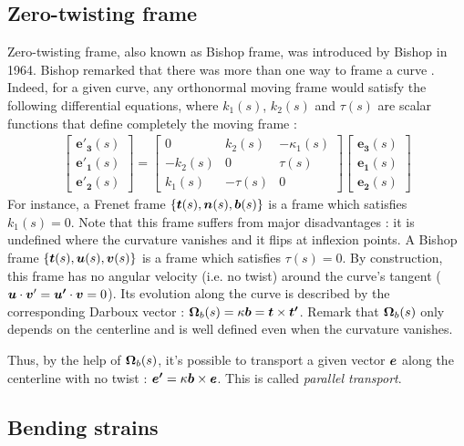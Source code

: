 \subsection{Zero-twisting frame}
Zero-twisting frame, also known as Bishop frame, was introduced by Bishop in 1964. Bishop remarked that there was more than one way to frame a curve \cite{Bishop1975}. Indeed, for a given curve, any orthonormal moving frame would satisfy the following differential equations, where $k_1(s)$, $k_2 (s)$ and $\tau(s)$ are scalar functions that define completely the moving frame :
\begin{gather}
	\begin{bmatrix}
		\mathbf{e'_{3}}(s) \\
		\mathbf{e'_{1}}(s) \\
		\mathbf{e'_{2}}(s)
	\end{bmatrix}
=
	\begin{bmatrix}
		0 & k_{2}(s) & -\kappa_{1}(s) \\
		-k_{2}(s) & 0 & \tau(s) \\
		k_{1}(s) & -\tau(s) & 0
	\end{bmatrix}
	\begin{bmatrix}
		\mathbf{e_{3}}(s) \\
		\mathbf{e_{1}}(s) \\
		\mathbf{e_{2}}(s)
	\end{bmatrix}
\end{gather}
For instance, a Frenet frame $\{\boldsymbol{t}(s),\boldsymbol{n}(s),\boldsymbol{b}(s)\}$ is a frame which satisfies $k_1(s)=0$. Note that this frame suffers from major disadvantages : it is undefined where the curvature vanishes and it flips at inflexion points.
A Bishop frame $\{\boldsymbol{t}(s),\boldsymbol{u}(s),\boldsymbol{v}(s)\}$ is a frame which satisfies $\tau(s)=0$. By construction, this frame has no angular velocity (i.e. no twist) around the curve’s tangent ($\boldsymbol{u}\cdot\boldsymbol{v}' = \boldsymbol{u'}\cdot\boldsymbol{v}=0$). Its evolution along the curve is described by the corresponding Darboux vector : $\boldsymbol{\Omega}_b(s)=\kappa\boldsymbol{b}=\boldsymbol{t}\times\boldsymbol{t'}$. Remark that $\boldsymbol{\Omega}_b(s)$ only depends on the centerline and is well defined even when the curvature vanishes.

Thus, by the help of $\boldsymbol{\Omega}_b(s)$, it’s possible to transport a given vector $\boldsymbol{e}$ along the centerline with no twist : $\boldsymbol{e'}=\kappa\boldsymbol{b}\times\boldsymbol{e}$. This is called \emph{parallel transport}.

\subsection{Bending strains}

